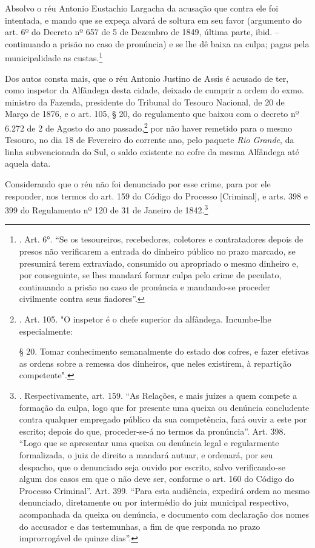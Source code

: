 Absolvo o réu Antonio Eustachio Largacha da acusação que contra ele foi
intentada, e mando que se expeça alvará de soltura em seu favor
(argumento do art. 6º do Decreto nº 657 de 5 de Dezembro de 1849, última
parte, ibid. -- continuando a prisão no caso de pronúncia) e se lhe dê
baixa na culpa; pagas pela municipalidade as custas.\footnote{. Art. 6°.
  ``Se os tesoureiros, recebedores, coletores e contratadores depois de
  presos não verificarem a entrada do dinheiro público no prazo marcado,
  se presumirá terem extraviado, consumido ou apropriado o mesmo
  dinheiro e, por conseguinte, se lhes mandará formar culpa pelo crime
  de peculato, continuando a prisão no caso de pronúncia e mandando-se
  proceder civilmente contra seus fiadores''.}

Dos autos consta mais, que o réu Antonio Justino de Assis é acusado de
ter, como inspetor da Alfândega desta cidade, deixado de cumprir a ordem
do exmo. ministro da Fazenda, presidente do Tribunal do Tesouro
Nacional, de 20 de Março de 1876, e o art. 105, § 20, do regulamento que
baixou com o decreto nº 6.272 de 2 de Agosto do ano passado,\footnote{.
  Art. 105. "O inspetor é o chefe superior da alfândega. Incumbe-lhe
  especialmente:

  § 20. Tomar conhecimento semanalmente do estado dos cofres, e fazer
  efetivas as ordens sobre a remessa dos dinheiros, que neles existirem,
  à repartição competente".} por não haver remetido para o mesmo
Tesouro, no dia 18 de Fevereiro do corrente ano, pelo paquete \emph{Rio
Grande}, da linha subvencionada do Sul, o saldo existente no cofre da
mesma Alfândega até aquela data.

Considerando que o réu não foi denunciado por esse crime, para por ele
responder, nos termos do art. 159 do Código do Processo {[}Criminal{]},
e arts. 398 e 399 do Regulamento nº 120 de 31 de Janeiro de
1842.\footnote{. Respectivamente, art. 159. ``As Relações, e mais juízes
  a quem compete a formação da culpa, logo que for presente uma queixa
  ou denúncia concludente contra qualquer empregado público da sua
  competência, fará ouvir a este por escrito; depois do que,
  proceder-se-á no termos da pronúncia''. Art. 398. ``Logo que se
  apresentar uma queixa ou denúncia legal e regularmente formalizada, o
  juiz de direito a mandará autuar, e ordenará, por seu despacho, que o
  denunciado seja ouvido por escrito, salvo verificando-se algum dos
  casos em que o não deve ser, conforme o art. 160 do Código do Processo
  Criminal''. Art. 399. ``Para esta audiência, expedirá ordem ao mesmo
  denunciado, diretamente ou por intermédio do juiz municipal
  respectivo, acompanhada da queixa ou denúncia, e documento com
  declaração dos nomes do accusador e das testemunhas, a fim de que
  responda no prazo improrrogável de quinze dias''.}

